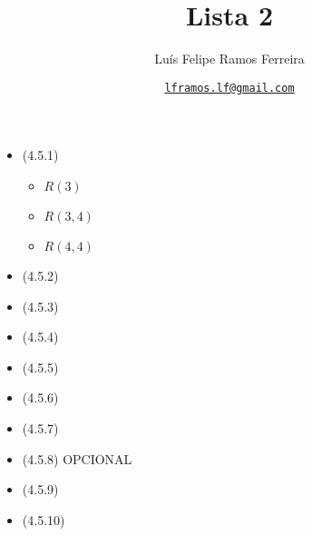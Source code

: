 \documentclass{article}
\title{Lista 2}
\author{Luís Felipe Ramos Ferreira}
\date{\href{mailto:lframos.lf@gmail.com}{\texttt{lframos.lf@gmail.com}}
}
\begin{document}
\maketitle

\begin{itemize}
	\item (4.5.1)
		\begin{itemize}
			\item \(R(3)\)
			\item \(R(3, 4)\)
			\item \(R(4, 4)\)
		\end{itemize}

	\item (4.5.2)
	\item (4.5.3)
	\item (4.5.4)
	\item (4.5.5)
	\item (4.5.6)
	\item (4.5.7)
	\item (4.5.8) OPCIONAL
	\item (4.5.9)
	\item (4.5.10)
\end{itemize}
\end{document}
